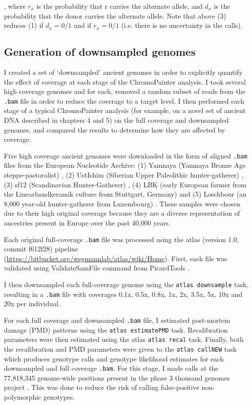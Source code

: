 , where  $r_{x}$ is the probability that r carries the alternate allele, and $d_{x}$ is the probability that the donor carries the alternate allele. Note that above (3) reduces (1) if $d_{x} = 0$/$1$ and if $r_{x} = 0$/$1$ (i.e. there is no uncertainty in the calls).


\subsection{Generation of downsampled genomes}

I created a set of `downsampled' ancient genomes in order to explicitly quantify the effect of coverage at each stage of the ChromoPainter analysis. I took several high coverage genomes and for each, removed a random subset of reads from the \texttt{.bam} file in order to reduce the coverage to a target level. I then performed each stage of a typical ChromoPainter analysis (for example, on a novel set of ancient DNA described in chapters 4 and 5) on the full coverage and downsampled genomes, and compared the results to determine how they are affected by coverage.

Five high coverage ancient genomes were downloaded in the form of aligned \texttt{.bam} files from the European Nucleotide Archive: (1) Yamnaya (Yamnaya Bronze Age steppe-pastoralist) \cite{deBarrosDamgaardeaar7711}, (2) UstIshim (Siberian Upper Paleolithic hunter-gatherer) \cite{Fu2014}, (3) sf12 (Scandinavian Hunter-Gatherer) \cite{Gunther2018a}, (4) LBK (early European farmer from the Linearbandkeramik culture from Stuttgart, Germany) \cite{Lazaridis2014} and (5) Loschbour (an 8,000 year-old hunter-gatherer from Luxembourg) \cite{Lazaridis2014}. These samples were chosen due to their high original coverage because they are a diverse representation of ancestries present in Europe over the past 40,000 years.  

Each original full-coverage \texttt{.bam} file was processed using the atlas (version 1.0, commit f612f28) pipeline \cite{Link2017} \\(\url{https://bitbucket.org/wegmannlab/atlas/wiki/Home}). First, each file was validated using ValidateSamFile command from PicardTools \cite{Picard2018toolkit}. 

I then downsampled each full-coverage genome using the \texttt{atlas downsample} task, resulting in a \texttt{.bam} file with coverages 0.1x, 0.5x, 0.8x, 1x, 2x, 3.5x, 5x, 10x and 20x per individual. 

For each full coverage and downsampled \texttt{.bam} file, I estimated post-mortem damage (PMD) patterns using the \texttt{atlas estimatePMD} task. Recalibration parameters were then estimated using the atlas \texttt{atlas recal} task. Finally, both the recalibration and PMD parameters were given to the \texttt{atlas callNEW} task which produces genotype calls and genotype likelihood estimates for each downsampled and full coverage \texttt{.bam}. For this stage, I made calls at the 77,818,345 genome-wide positions present in the phase 3 thousand genomes project \cite{1000GenomesProjectConsortium2015}. This was done to reduce the risk of calling false-positive non-polymorphic genotypes.

